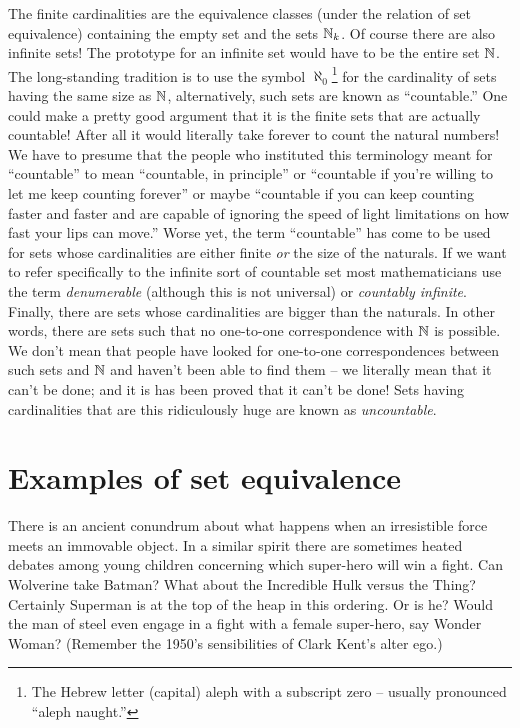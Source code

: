 The finite cardinalities are the equivalence classes (under the relation of
set equivalence) containing the empty set and the sets ${\mathbb N}_k$.  
Of course there
are also infinite sets!  The prototype for an infinite set would have to be
the entire set ${\mathbb N}$.  
The long-standing tradition is to use the 
symbol  
$\aleph_0$\footnote{The Hebrew letter (capital) aleph with a %
subscript zero -- usually pronounced ``aleph naught.''} 
for the cardinality 
of sets having the same size as ${\mathbb N}$, alternatively, such sets 
are known as ``countable.''  One could make a pretty good argument that 
it is the finite sets that are actually countable!  After all it would literally take forever to count the natural numbers!  We have to presume that the 
people who instituted
this terminology meant for ``countable'' to mean ``countable, in principle''
or ``countable if you're willing to let me keep counting forever'' or maybe
``countable if you can keep counting faster and faster and are capable of
ignoring the speed of light limitations on how fast your lips can move.''  Worse
yet, the term ``countable'' has come to be used for sets whose cardinalities are
either finite \emph{or} the size of the naturals.  If we want to refer specifically to the infinite sort of countable set most mathematicians 
use the term \emph{denumerable} (although this is not universal) or  \emph{countably infinite}.  
Finally, there are sets
whose cardinalities are bigger than the naturals.   In other words, there are
sets such that no one-to-one correspondence with ${\mathbb N}$ is possible.  
We don't mean that people have looked for one-to-one correspondences 
between such sets and ${\mathbb N}$ and haven't been able to find them -- we literally mean that it can't be done; and it is has been proved that it can't be done! Sets having cardinalities that are this ridiculously huge are known as  \emph{uncountable}. 


\clearpage




\newpage

\section{Examples of set equivalence}

There is an ancient conundrum about what happens when an irresistible force
meets an immovable object.  In a similar spirit there are sometimes heated
debates among young children concerning which super-hero will win a fight.
Can Wolverine take Batman?  What about the Incredible Hulk versus the
Thing?  Certainly Superman is at the top of the heap in this ordering.  Or is
he?  Would the man of steel even engage in a fight with a female super-hero,
say Wonder Woman?  (Remember the 1950's sensibilities of Clark Kent's
alter ego.)

